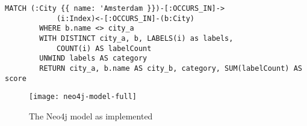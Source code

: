 \begin{lstlisting}[language=cypher, caption={Counting distinct labels}, label={lst:query-counts}]
MATCH (:City {{ name: 'Amsterdam }})-[:OCCURS_IN]->
            (i:Index)<-[:OCCURS_IN]-(b:City)
        WHERE b.name <> city_a
        WITH DISTINCT city_a, b, LABELS(i) as labels,
            COUNT(i) AS labelCount
        UNWIND labels AS category
        RETURN city_a, b.name AS city_b, category, SUM(labelCount) AS score
\end{lstlisting}

\begin{figure}
    \centering
    \texttt{[image: neo4j-model-full]}
    \caption{The Neo4j model as implemented}
    \label{fig:my_label}
\end{figure}


